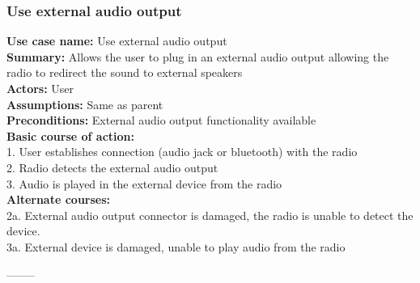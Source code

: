 \documentclass[11pt]{article}
\begin{document}
\subsubsection{Use external audio output}
\textbf{Use case name:} Use external audio output\\
\textbf{Summary:} Allows the user to plug in an external audio output allowing the radio to redirect the sound to external speakers\\
\textbf{Actors:} User\\
\textbf{Assumptions:} Same as parent\\
\textbf{Preconditions:} External audio output functionality available\\
\textbf{Basic course of action:}\\
\hspace*{10mm}1. User establishes connection (audio jack or bluetooth) with the radio\\
\hspace*{10mm}2. Radio detects the external audio output\\
\hspace*{10mm}3. Audio is played in the external device from the radio\\
\textbf{Alternate courses:}\\
\hspace*{10mm}2a. External audio output connector is damaged, the radio is unable to detect the device.\\
\hspace*{10mm}3a. External device is damaged, unable to play audio from the radio\\
\begin{center}--------\end{center}
\end{document}
